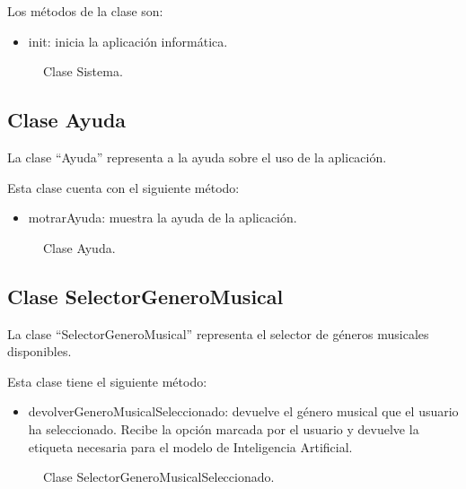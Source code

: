 Los métodos de la clase son:

\begin{itemize}
    \item init: inicia la aplicación informática.
\end{itemize}

\begin{figure}[H]
  \centering
  
  \caption{Clase Sistema.}
\end{figure}


\subsection{Clase Ayuda}

La clase ``Ayuda'' representa a la ayuda sobre el uso de la aplicación.

Esta clase cuenta con el siguiente método:

\begin{itemize}
    \item motrarAyuda: muestra la ayuda de la aplicación.
\end{itemize}

\begin{figure}[H]
  \centering
  
  \caption{Clase Ayuda.}
\end{figure}

\subsection{Clase SelectorGeneroMusical}

La clase ``SelectorGeneroMusical'' representa el selector de géneros musicales disponibles.

Esta clase tiene el siguiente método:

\begin{itemize}
    \item devolverGeneroMusicalSeleccionado: devuelve el género musical que el usuario ha seleccionado. Recibe la opción marcada por el usuario y devuelve la etiqueta necesaria para el modelo de Inteligencia Artificial.
\end{itemize}

\begin{figure}[H]
  \centering
  
  \caption{Clase SelectorGeneroMusicalSeleccionado.}
\end{figure}


